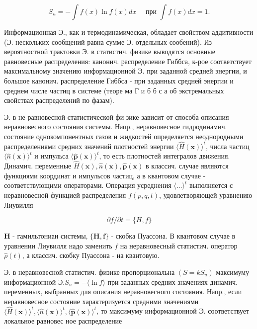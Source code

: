 \documentclass[10pt]{article}
\begin{document}
\[

S_{u}=-\int f(x) \ln f(x) d x \quad \text { при } \int f(x) d x=1 .

\]



Информационная Э., как и термодинамическая, обладает свойством аддитивности (Э. нескольких сообщений равна сумме Э. отдельных сообений). Из вероятностной трактовки Э. в статистич. физике выводятся основные равновесные распределения: канонич. распределение Гиббса, к-рое соответствует максимальному значению информационной Э. при заданной средней энергии, и большое канонич. распределение Гиббса - при заданных средней энергии и среднем числе частиц в системе (теоре ма Г и б б с а об экстремальных свойствах распределений по фазам).



Э. в не равновесной статистической фи зике зависит от способа описания неравновесного состояния системы. Напр., неравновесное гидродинамич. состояние однокомпонентных газов и жидкостей определяется неоднородными распределениями средних значений плотностей энергии $\langle\hat{H}(\boldsymbol{x})\rangle^{t}$, числа частиц $\langle\hat{n}(\boldsymbol{x})\rangle^{t}$ и импульса $\langle\hat{\boldsymbol{p}}(\boldsymbol{x})\rangle^{t}$, то есть плотностей интегралов движения. Динамич. переменные $\hat{H}(\boldsymbol{x}), \hat{n}(\boldsymbol{x}), \hat{\boldsymbol{p}}(\boldsymbol{x})$ в классич. случае являются функциями координат и импульсов частиц, а в квантовом случае - соответствующими операторами. Операция усреднения $\langle\ldots\rangle^{t}$ выполняется с неравновесной функцией распределения $f(p, q, t)$, удовлетворяющей уравнению Лиувилля



\[

\partial f / \partial t=\{H, f\}

\]



$\boldsymbol{H}$ - гамильтониан системы, $\{\boldsymbol{H}, \boldsymbol{f}\}$ - скобка Пуассона. В квантовом случае в уравнении Лиувилля надо заменить $f$ на неравновесный статистич. оператор $\hat{\rho}(t)$, а классич. скобку Пуассона - на квантовую.



Э. в неравновесной статистич. физике пропорциональна $\left(S=k S_{u}\right)$ максимуму информационной $Э . S_{u}=-\langle\ln f\rangle$ при заданных средних значениях динамич. переменных, выбранных для описания неравновесного состояния. Напр., если неравновесное состояние характеризуется средними значениями $\langle\hat{H}(\boldsymbol{x})\rangle^{t},\langle\hat{n}(\boldsymbol{x})\rangle^{t},\langle\hat{\boldsymbol{p}}(\boldsymbol{x})\rangle^{t}$, то максимуму информационной Э. соответствует локальное равновес ное распределение
\end{document}
